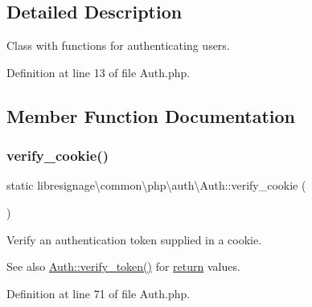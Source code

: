 \subsection{Detailed Description}
Class with functions for authenticating users. 

Definition at line 13 of file Auth.\+php.



\subsection{Member Function Documentation}
\mbox{\label{classlibresignage_1_1common_1_1php_1_1auth_1_1Auth_aef510d03645d2c2bc43b516f66806717}} 
\subsubsection{\texorpdfstring{verify\+\_\+cookie()}{verify\_cookie()}}
{\footnotesize\ttfamily static libresignage\textbackslash{}common\textbackslash{}php\textbackslash{}auth\textbackslash{}\+Auth\+::verify\+\_\+cookie (\begin{DoxyParamCaption}{ }\end{DoxyParamCaption})\hspace{0.3cm}{\ttfamily [static]}}

Verify an authentication token supplied in a cookie.

\begin{DoxySeeAlso}{See also}
\hyperlink{classlibresignage_1_1common_1_1php_1_1auth_1_1Auth_a6557d3a404668af8036f3055369ca168}{Auth\+::verify\+\_\+token()} for \hyperlink{quota_200-default_8php_ae057f510746f2e7dcbd7d8ccfaf92a45}{return} values. 
\end{DoxySeeAlso}


Definition at line 71 of file Auth.\+php.

\mbox{\label{classlibresignage_1_1common_1_1php_1_1auth_1_1Auth_a398fad430d9d4c1a4dad69461fa36616}} 
